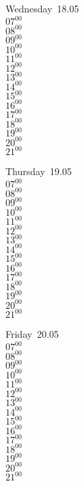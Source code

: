 \documentclass[11pt,a4paper]{book}\usepackage[]{graphicx}\usepackage[]{color}
\begin{document}
\begin{weekdaybox}
  Wednesday~18.05\\
  { 
  \vfill
  $07^{00}$\\
$08^{00}$\\
$09^{00}$\\
$10^{00}$\\
$11^{00}$\\
$12^{00}$\\
$13^{00}$\\
$14^{00}$\\
$15^{00}$\\
$16^{00}$\\
$17^{00}$\\
$18^{00}$\\
$19^{00}$\\
$20^{00}$\\
$21^{00}$\\
  }
\end{weekdaybox}
\clearpage
\begin{headerbox}
\end{headerbox}
\begin{weekdaybox}
  Thursday~19.05\\
  { 
  \vfill
  $07^{00}$\\
$08^{00}$\\
$09^{00}$\\
$10^{00}$\\
$11^{00}$\\
$12^{00}$\\
$13^{00}$\\
$14^{00}$\\
$15^{00}$\\
$16^{00}$\\
$17^{00}$\\
$18^{00}$\\
$19^{00}$\\
$20^{00}$\\
$21^{00}$\\
  }
\end{weekdaybox} 
\begin{weekdaybox}
  Friday~20.05\\
  { 
  \vfill
  $07^{00}$\\
$08^{00}$\\
$09^{00}$\\
$10^{00}$\\
$11^{00}$\\
$12^{00}$\\
$13^{00}$\\
$14^{00}$\\
$15^{00}$\\
$16^{00}$\\
$17^{00}$\\
$18^{00}$\\
$19^{00}$\\
$20^{00}$\\
$21^{00}$\\
  }
\end{weekdaybox}
\end{document}
